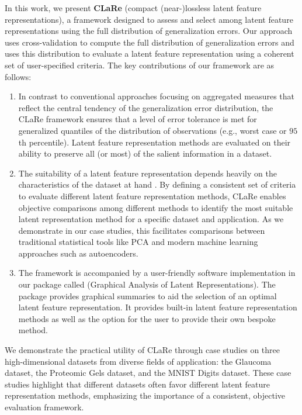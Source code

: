 In this work, we present \textbf{CLaRe} (compact (near-)lossless latent feature representations), a framework designed to assess and select among latent feature representations using the full distribution of generalization errors.
Our approach uses cross-validation to compute the full distribution of generalization errors and uses this distribution to evaluate a latent feature representation using a coherent set of user-specified criteria.
The key contributions of our framework are as follows:
\begin{enumerate}
    \item In contrast to conventional approaches focusing on aggregated measures that reflect the central tendency of the generalization error distribution, the CLaRe framework ensures that a level of error tolerance is met for generalized quantiles of the distribution of observations (e.g., worst case or $95$th percentile). Latent feature representation methods are evaluated on their ability to preserve all (or most) of the salient information in a dataset.
    \item The suitability of a latent feature representation depends heavily on the characteristics of the dataset at hand \parencite[Section 3, pp. 325--328]{morris_functional_2015}.
    By defining a consistent set of criteria to evaluate different latent feature representation methods, CLaRe enables objective comparisons among different methods to identify the most suitable latent representation method for a specific dataset and application.
    As we demonstrate in our case studies, this facilitates comparisons between traditional statistical tools like PCA and modern machine learning approaches such as autoencoders.
    \item The framework is accompanied by a user-friendly software implementation in our  package called  (Graphical Analysis of Latent Representations).
    The package provides graphical summaries to aid the selection of an optimal latent feature representation.
    It provides built-in latent feature representation methods as well as the option for the user to provide their own bespoke method.
\end{enumerate}
We demonstrate the practical utility of CLaRe through case studies on three high-dimensional datasets from diverse fields of application: the Glaucoma dataset, the Proteomic Gels dataset, and the MNIST Digits dataset.
These case studies highlight that different datasets often favor different latent feature representation methods, emphasizing the importance of a consistent, objective evaluation framework.


